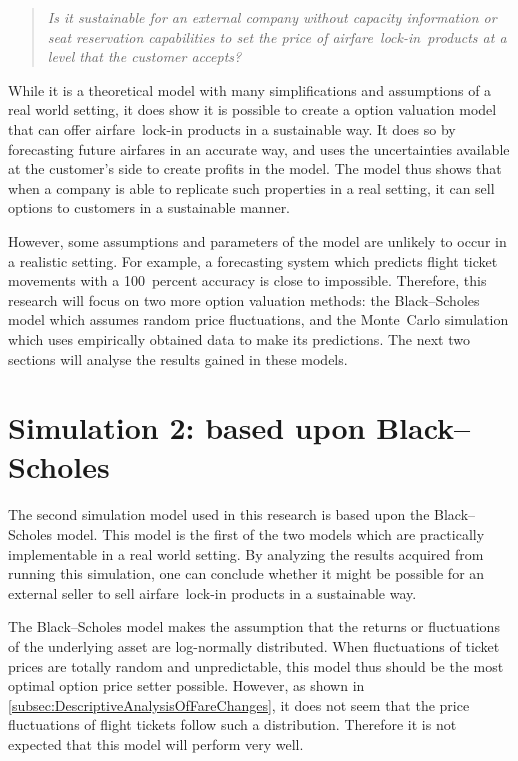 \begin{quote}\emph{Is it sustainable for an external company without capacity information or seat reservation capabilities to set the price of airfare~lock-in~products at a level that the customer accepts?}\end{quote}

While it is a theoretical model with many simplifications and assumptions of a real world setting, it does show it is possible to create a option valuation model that can offer airfare~lock-in products in a sustainable way. It does so by forecasting future airfares in an accurate way, and uses the uncertainties available at the customer's side to create profits in the model. The model thus shows that when a company is able to replicate such properties in a real setting, it can sell options to customers in a sustainable manner.

However, some assumptions and parameters of the model are unlikely to occur in a realistic setting. For example, a forecasting system which predicts flight ticket movements with a 100~percent accuracy is close to impossible. Therefore, this research will focus on two more option valuation methods: the Black--Scholes model which assumes random price fluctuations, and the Monte~Carlo simulation which uses empirically obtained data to make its predictions. The next two sections will analyse the results gained in these models.



\section{Simulation 2: based upon Black--Scholes}
The second simulation model used in this research is based upon the Black--Scholes model. This model is the first of the two models which are practically implementable in a real world setting. By analyzing the results acquired from running this simulation, one can conclude whether it might be possible for an external seller to sell airfare~lock-in products in a sustainable way.

The Black--Scholes model makes the assumption that the returns or fluctuations of the underlying asset are log-normally distributed. When fluctuations of ticket prices are totally random and unpredictable, this model thus should be the most optimal option price setter possible. However, as shown in \autoref{subsec:DescriptiveAnalysisOfFareChanges}, it does not seem that the price fluctuations of flight tickets follow such a distribution. Therefore it is not expected that this model will perform very well.

